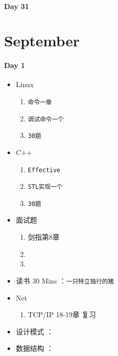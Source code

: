 \documentclass[UTF8,a4paper,8pt]{ctexart}
\begin{document}
 	 \paragraph{Day 31      \quad     }
 \section{September}
 	 \paragraph{Day 1       \quad     }
	 	 \begin{itemize}[itemindent = 1em]
	 	 	\renewcommand\labelitemi{\makebox[0pt][l]{$\square$}\hspace{1em}} 
	 	 	\renewcommand\labelitemi{\makebox[0pt][l]{$\square$}\raisebox{.15ex}{\hspace{0.1em}$\checkmark$}}	 	
	 	 	\item   Linux 
	 	 	\begin{enumerate}
	 	 		\item \verb|命令一章|
	 	 		\item \verb|调试命令一个|
	 	 		\item \verb|30题|
	 	 	\end{enumerate}
	 	 	\item   C++   
	 	 	\begin{enumerate}
	 	 		\item \verb|Effective|
	 	 		\item \verb|STL实现一个|
	 	 		\item \verb|30题|
	 	 	\end{enumerate}
	 	 	
	 	 	\item  面试题
	 	 	\begin{enumerate}
	 	 		\item 剑指第8章
	 	 		\item 
	 	 		\item 
	 	 	\end{enumerate}
	 	 	
	 	 	\item   读书  30 Mins	：\verb|一只特立独行的猪|
	 	 	\item   Net
	 	 	\begin{enumerate}
	 	 		\item TCP/IP  18-19章 复习
	 	 	\end{enumerate}	
	 	 	
	 	 	\renewcommand\labelitemi{\makebox[0pt][l]{$\square$}\hspace{1em}}
	 	 	\item   设计模式 ：\verb|| 
	 	 	\item   数据结构 ：\verb|| 
	 	 \end{itemize}
\end{document}
